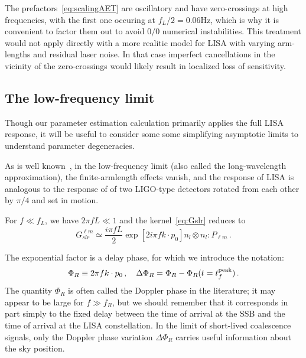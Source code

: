 \documentclass[aps,showpacs,twocolumn,prd,superscriptaddress,nofootinbib]{revtex4-1}
\newcommand{\be}{\begin{equation}}
\newcommand{\ee}{\end{equation}}
\begin{document}
The prefactors~\eqref{eq:scalingAET} are oscillatory and have zero-crossings at high frequencies, with the first one occuring at $f_{L}/2 = 0.06 \mathrm{Hz}$, which is why it is convenient to factor them out to avoid $0/0$ numerical instabilities. This treatment would not apply directly with a more realitic model for LISA with varying arm-lengths and residual laser noise. In that case imperfect cancellations in the vicinity of the zero-crossings would likely result in localized loss of sensitivity.


\subsection{The low-frequency limit}
\label{subsec:lowfresponse}

Though our parameter estimation calculation primarily applies the full LISA response, it will be useful to consider some some simplifying asymptotic limits to understand parameter degeneracies.

As is well known~\cite{Cutler97}, in the low-frequency limit (also called the long-wavelength approximation), the finite-armlength effects vanish, and the response of LISA is analogous to the response of of two LIGO-type detectors rotated from each other by $\pi/4$ and set in motion.

For $f \ll f_{L}$, we have $2\pi f L \ll 1$ and the kernel~\eqref{eq:Gslr} reduces to
\be\label{eq:Gslrlowf}
	G^{\ell m}_{slr} \simeq \frac{i \pi f L}{2} \exp\left[ 2 i \pi f k\cdot p_{0} \right] n_{l} \otimes n_{l} : P_{\ell m}\,.
\ee

The exponential factor is a delay phase, for which we introduce the notation:
\be\label{eq:defPhiR}
	\Phi_{R} \equiv 2 \pi f k\cdot p_{0} \,, \quad \Delta \Phi_{R} = \Phi_{R} - \Phi_{R}(t=t_{f}^{\rm peak}) \,.
\ee
The quantity $\Phi_{R}$ is often called the Doppler phase in the literature; it may appear to be large for $f \gg f_{R}$, but we should remember that it corresponds in part simply to the fixed delay between the time of arrival at the SSB and the time of arrival at the LISA constellation. In the limit of short-lived coalescence signals, only the Doppler phase variation $\Delta \Phi_{R}$ carries useful information about the sky position.
\end{document}
